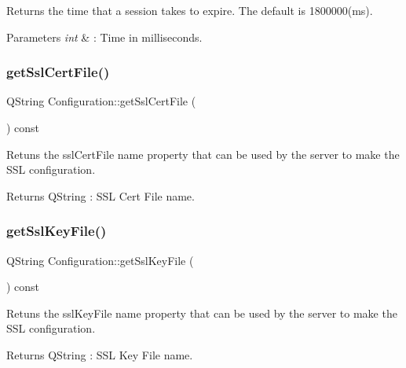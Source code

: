 Returns the time that a session takes to expire. The default is 1800000(ms). 


\begin{DoxyParams}{Parameters}
{\em int} & \+: Time in milliseconds. \\
\hline
\end{DoxyParams}
\mbox{\label{class_configuration_a10405dacfb3b61f60b290c0a5d79a8fb}} 
\subsubsection{\texorpdfstring{get\+Ssl\+Cert\+File()}{getSslCertFile()}}
{\footnotesize\ttfamily Q\+String Configuration\+::get\+Ssl\+Cert\+File (\begin{DoxyParamCaption}{ }\end{DoxyParamCaption}) const}



Retuns the ssl\+Cert\+File name property that can be used by the server to make the S\+SL configuration. 

\begin{DoxyReturn}{Returns}
Q\+String \+: S\+SL Cert File name. 
\end{DoxyReturn}
\mbox{\label{class_configuration_a96082bdd3333d8ddf2017a95fe302225}} 
\subsubsection{\texorpdfstring{get\+Ssl\+Key\+File()}{getSslKeyFile()}}
{\footnotesize\ttfamily Q\+String Configuration\+::get\+Ssl\+Key\+File (\begin{DoxyParamCaption}{ }\end{DoxyParamCaption}) const}



Retuns the ssl\+Key\+File name property that can be used by the server to make the S\+SL configuration. 

\begin{DoxyReturn}{Returns}
Q\+String \+: S\+SL Key File name. 
\end{DoxyReturn}
\mbox{\label{class_configuration_a3cd126ebe20117c04b4d38797e06551d}} 
